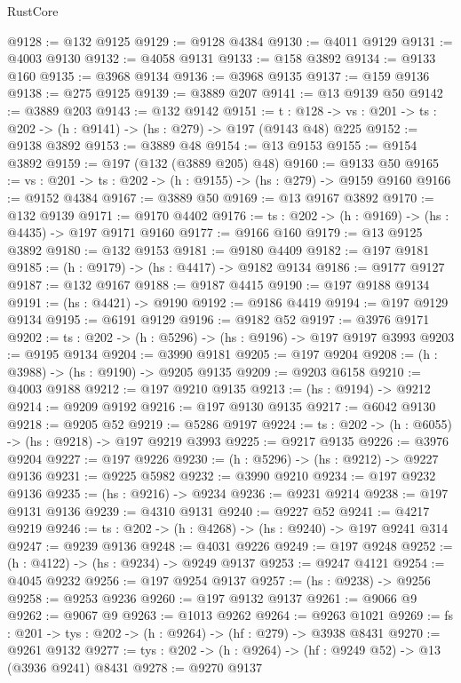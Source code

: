 \begin{lexlean}{RustCore}
\begin{coremodule}
@9128 := @132 @9125
@9129 := @9128 @4384
@9130 := @4011 @9129
@9131 := @4003 @9130
@9132 := @4058 @9131
@9133 := @158 @3892
@9134 := @9133 @160
@9135 := @3968 @9134
@9136 := @3968 @9135
@9137 := @159 @9136
@9138 := @275 @9125
@9139 := @3889 @207
@9141 := @13 @9139 @50
@9142 := @3889 @203
@9143 := @132 @9142
@9151 := {t : @128} ->
  {vs : @201} -> {ts : @202} -> (h : @9141) -> (hs : @279) -> @197 (@9143 @48) @225
@9152 := @9138 @3892
@9153 := @3889 @48
@9154 := @13 @9153
@9155 := @9154 @3892
@9159 := @197 (@132 (@3889 @205) @48)
@9160 := @9133 @50
@9165 := {vs : @201} -> {ts : @202} -> (h : @9155) -> (hs : @279) -> @9159 @9160
@9166 := @9152 @4384
@9167 := @3889 @50
@9169 := @13 @9167 @3892
@9170 := @132 @9139
@9171 := @9170 @4402
@9176 := {ts : @202} -> (h : @9169) -> (hs : @4435) -> @197 @9171 @9160
@9177 := @9166 @160
@9179 := @13 @9125 @3892
@9180 := @132 @9153
@9181 := @9180 @4409
@9182 := @197 @9181
@9185 := (h : @9179) -> (hs : @4417) -> @9182 @9134
@9186 := @9177 @9127
@9187 := @132 @9167
@9188 := @9187 @4415
@9190 := @197 @9188 @9134
@9191 := (hs : @4421) -> @9190
@9192 := @9186 @4419
@9194 := @197 @9129 @9134
@9195 := @6191 @9129
@9196 := @9182 @52
@9197 := @3976 @9171
@9202 := {ts : @202} -> (h : @5296) -> (hs : @9196) -> @197 @9197 @3993
@9203 := @9195 @9134
@9204 := @3990 @9181
@9205 := @197 @9204
@9208 := (h : @3988) -> (hs : @9190) -> @9205 @9135
@9209 := @9203 @6158
@9210 := @4003 @9188
@9212 := @197 @9210 @9135
@9213 := (hs : @9194) -> @9212
@9214 := @9209 @9192
@9216 := @197 @9130 @9135
@9217 := @6042 @9130
@9218 := @9205 @52
@9219 := @5286 @9197
@9224 := {ts : @202} -> (h : @6055) -> (hs : @9218) -> @197 @9219 @3993
@9225 := @9217 @9135
@9226 := @3976 @9204
@9227 := @197 @9226
@9230 := (h : @5296) -> (hs : @9212) -> @9227 @9136
@9231 := @9225 @5982
@9232 := @3990 @9210
@9234 := @197 @9232 @9136
@9235 := (hs : @9216) -> @9234
@9236 := @9231 @9214
@9238 := @197 @9131 @9136
@9239 := @4310 @9131
@9240 := @9227 @52
@9241 := @4217 @9219
@9246 := {ts : @202} -> (h : @4268) -> (hs : @9240) -> @197 @9241 @314
@9247 := @9239 @9136
@9248 := @4031 @9226
@9249 := @197 @9248
@9252 := (h : @4122) -> (hs : @9234) -> @9249 @9137
@9253 := @9247 @4121
@9254 := @4045 @9232
@9256 := @197 @9254 @9137
@9257 := (hs : @9238) -> @9256
@9258 := @9253 @9236
@9260 := @197 @9132 @9137
@9261 := @9066 @9
@9262 := @9067 @9
@9263 := @1013 @9262
@9264 := @9263 @1021
@9269 := {fs : @201} -> {tys : @202} -> (h : @9264) -> (hf : @279) -> @3938 @8431
@9270 := @9261 @9132
@9277 := {tys : @202} -> (h : @9264) -> (hf : @9249 @52) -> @13 (@3936 @9241) @8431
@9278 := @9270 @9137

\end{coremodule}
\end{lexlean}
